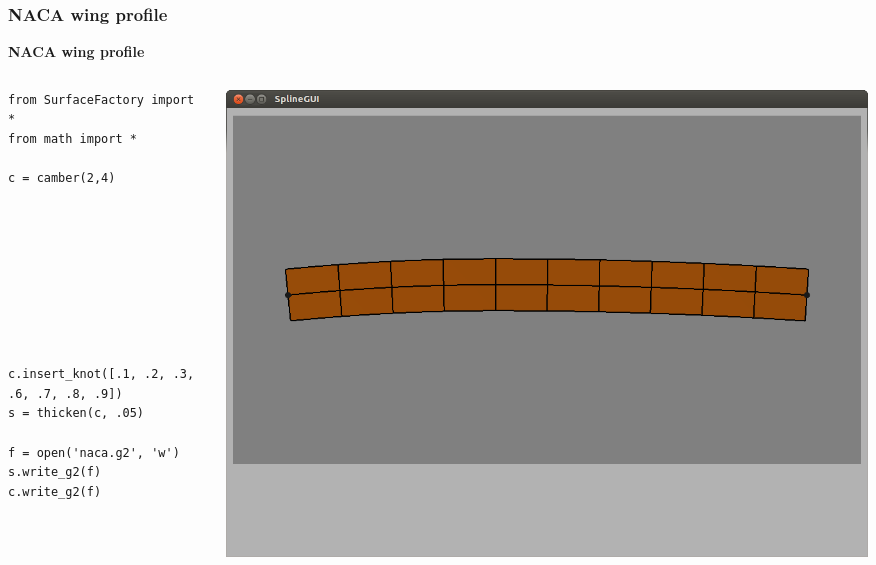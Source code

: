 \documentclass{beamer}
\theoremstyle{plain}
\theoremstyle{definition}
\begin{document}

\begin{frame}[fragile]
\frametitle{NACA wing profile}
\textbf{NACA wing profile}

\begin{columns}
    \begin{column}{.50\linewidth}
        \begin{listing}[H]
            \tiny
            \begin{verbatim}
from SurfaceFactory import *
from math import *

c = camber(2,4)








    
c.insert_knot([.1, .2, .3, .6, .7, .8, .9])
s = thicken(c, .05)

f = open('naca.g2', 'w')
s.write_g2(f)
c.write_g2(f)

            \end{verbatim}
        \end{listing}
    \end{column}
    \begin{column}{.45\linewidth}
        \includegraphics[width=\linewidth]{naca1}
    \end{column}
\end{columns}
\end{frame}

\end{document}
